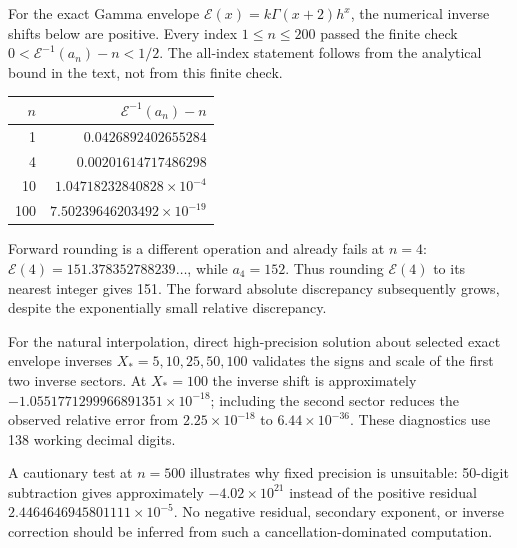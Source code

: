 \documentclass[11pt,letterpaper]{article}
\theoremstyle{remark}\newtheorem{remark}[theorem]{Remark}
\begin{document}
For the exact Gamma envelope $\mathcal E(x)=k\Gamma(x+2)h^x$, the numerical inverse
shifts below are positive. Every index $1\le n\le200$ passed the finite
check $0<\mathcal E^{-1}(a_n)-n<1/2$. The all-index statement follows from the
analytical bound in the text, not from this finite check.
\begin{center}
\begin{tabular}{rr}
\toprule
$n$ & $\mathcal E^{-1}(a_n)-n$ \\
\midrule
1 & $0.0426892402655284$ \\
4 & $0.00201614717486298$ \\
10 & $1.04718232840828\times10^{-4}$ \\
100 & $7.50239646203492\times10^{-19}$ \\
\bottomrule
\end{tabular}
\end{center}
Forward rounding is a different operation and already fails at $n=4$:
$\mathcal E(4)=151.378352788239\ldots$, while $a_4=152$. Thus rounding $\mathcal E(4)$ to
its nearest integer gives 151. The forward absolute discrepancy subsequently
grows, despite the exponentially small relative discrepancy.

For the natural interpolation, direct high-precision solution about selected
exact envelope inverses $X_*=5,10,25,50,100$ validates the signs and scale of
the first two inverse sectors. At $X_*=100$ the inverse shift is approximately
$-1.0551771299966891351\times10^{-18}$; including the second sector reduces
the observed relative error from $2.25\times10^{-18}$ to
$6.44\times10^{-36}$. These diagnostics use 138 working decimal digits.

A cautionary test at $n=500$ illustrates why fixed precision is unsuitable:
50-digit subtraction gives approximately $-4.02\times10^{21}$ instead of the
positive residual $2.4464646945801111\times10^{-5}$. No negative residual,
secondary exponent, or inverse correction should be inferred from such a
cancellation-dominated computation.
\end{document}
